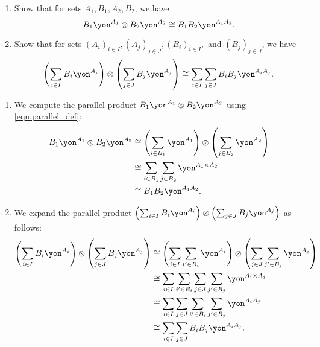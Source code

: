 \documentclass[Book-Poly]{subfiles}
\begin{document}


\begin{exercise} \label{exc.general_poly_parallel_times}
\begin{enumerate}
    \item \label{exc.general_poly_parallel_times.monomial} Show that for sets $A_1, B_1, A_2, B_2$, we have
    \[
        B_1\yon^{A_1} \otimes B_2\yon^{A_2} \iso B_1 B_2\yon^{A_1 A_2}.
    \]
    \item \label{exc.general_poly_parallel_times.polynomial} Show that for sets $(A_i)_{i \in I},(A_j)_{j \in J},(B_i)_{i \in I},$ and $(B_j)_{j \in J}$, we have
    \[
        \left(\sum_{i \in I} B_i\yon^{A_i}\right) \otimes \left(\sum_{j \in J} B_j\yon^{A_j}\right) \iso \sum_{i \in I} \sum_{j \in J} B_i B_j \yon^{A_i A_j}.
    \]
\end{enumerate}
\begin{solution}
\begin{enumerate}
    \item We compute the parallel product $B_1\yon^{A_1} \otimes B_2\yon^{A_2}$ using \eqref{eqn.parallel_def}:
    \begin{align*}
        B_1\yon^{A_1} \otimes B_2\yon^{A_2} &\iso \left(\sum_{i \in B_1} \yon^{A_1}\right) \otimes \left(\sum_{j \in B_2} \yon^{A_2}\right) \\
        &\iso \sum_{i \in B_1} \sum_{j \in B_2} \yon^{A_1 \times A_2} \\
        &\iso B_1 B_2\yon^{A_1 A_2}.
    \end{align*}

    \item We expand the parallel product $\left(\sum_{i \in I} B_i\yon^{A_i}\right) \otimes \left(\sum_{j \in J} B_j\yon^{A_j}\right)$ as follows:
    \begin{align*}
        \left(\sum_{i \in I} B_i\yon^{A_i}\right) \otimes \left(\sum_{j \in J} B_j\yon^{A_j}\right) &\iso \left(\sum_{i \in I} \sum_{i' \in B_i} \yon^{A_i}\right) \otimes \left(\sum_{j \in J} \sum_{j' \in B_j} \yon^{A_j}\right) \\
        &\iso \sum_{i \in I} \sum_{i' \in B_i} \sum_{j \in J} \sum_{j' \in B_j} \yon^{A_i \times A_j} \\
        &\iso \sum_{i \in I} \sum_{j \in J} \sum_{i' \in B_i} \sum_{j' \in B_j} \yon^{A_i A_j} \\
        &\iso \sum_{i \in I} \sum_{j \in J} B_i B_j \yon^{A_i A_j}.
    \end{align*}
\end{enumerate}
\end{solution}
\end{exercise}
\end{document}
